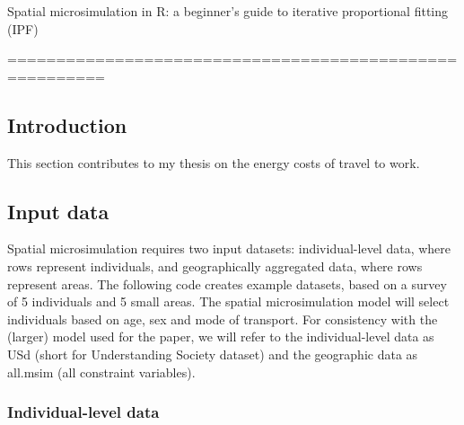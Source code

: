 
 


Spatial microsimulation in R: a beginner's guide to iterative
proportional fitting (IPF)

========================================================

\subsection{Introduction}

This section contributes to my thesis on the energy costs of travel to
work.

\subsection{Input data}

Spatial microsimulation requires two input datasets: individual-level
data, where rows represent individuals, and geographically aggregated
data, where rows represent areas. The following code creates example
datasets, based on a survey of 5 individuals and 5 small areas. The
spatial microsimulation model will select individuals based on age, sex
and mode of transport. For consistency with the (larger) model used for
the paper, we will refer to the individual-level data as USd (short for
Understanding Society dataset) and the geographic data as all.msim (all
constraint variables).

\subsubsection{Individual-level data}

